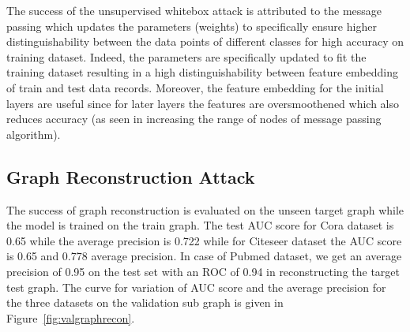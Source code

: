 The success of the unsupervised whitebox attack is attributed to the message passing which updates the parameters (weights) to specifically ensure higher distinguishability between the data points of different classes for high accuracy on training dataset.
Indeed, the parameters are specifically updated to fit the training dataset resulting in a high distinguishability between feature embedding of train and test data records.
Moreover, the feature embedding for the initial layers are useful since for later layers the features are oversmoothened which also reduces accuracy (as seen in increasing the range of nodes of message passing algorithm).




\subsection{Graph Reconstruction Attack}

The success of graph reconstruction is evaluated on the unseen target graph while the model is trained on the train graph.
The test AUC score for Cora dataset is 0.65 while the average precision is 0.722 while for Citeseer dataset the AUC score is 0.65 and 0.778 average precision.
In case of Pubmed dataset, we get an average precision of 0.95 on the test set with an ROC of 0.94 in reconstructing the target test graph.
The curve for variation of AUC score and the average precision for the three datasets on the validation sub graph is given in Figure~\ref{fig:valgraphrecon}.

